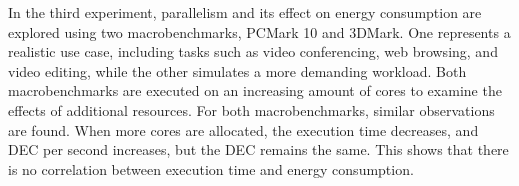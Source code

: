 In the third experiment, parallelism and its effect on energy consumption are explored using two macrobenchmarks, PCMark 10 and 3DMark. One represents a realistic use case, including tasks such as video conferencing, web browsing, and video editing, while the other simulates a more demanding workload. Both macrobenchmarks are executed on an increasing amount of cores to examine the effects of additional resources. For both macrobenchmarks, similar observations are found. When more cores are allocated, the execution time decreases, and DEC per second increases, but the DEC remains the same. This shows that there is no correlation between execution time and energy consumption.  


